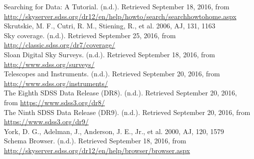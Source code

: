 \documentclass[10pt,letterpaper]{article}
\begin{document}
\begin{thebibliography}{1}
 Searching for Data: A Tutorial. (n.d.). Retrieved September 18, 2016, from \url{http://skyserver.sdss.org/dr12/en/help/howto/search/searchhowtohome.aspx}\\

 Skrutskie, M. F., Cutri, R. M., Stiening, R., et al. 2006, AJ, 131, 1163\\

 Sky coverage. (n.d.). Retrieved September 25, 2016, from \url{http://classic.sdss.org/dr7/coverage/}\\

 Sloan Digital Sky Surveys. (n.d.). Retrieved September 18, 2016, from \url{http://www.sdss.org/surveys/}\\

 Telescopes and Instruments. (n.d.). Retrieved September 20, 2016, from \url{http://www.sdss.org/instruments/}\\

 The Eighth SDSS Data Release (DR8). (n.d.). Retrieved September 20, 2016, from \url{https://www.sdss3.org/dr8/}\\

 The Ninth SDSS Data Release (DR9). (n.d.). Retrieved September 20, 2016, from \url{https://www.sdss3.org/dr9/}\\

 York, D. G., Adelman, J., Anderson, J. E., Jr., et al. 2000, AJ, 120, 1579\\

 Schema Browser. (n.d.). Retrieved September 18, 2016, from \url{http://skyserver.sdss.org/dr12/en/help/browser/browser.aspx}\\

\end{thebibliography}
\end{document}
